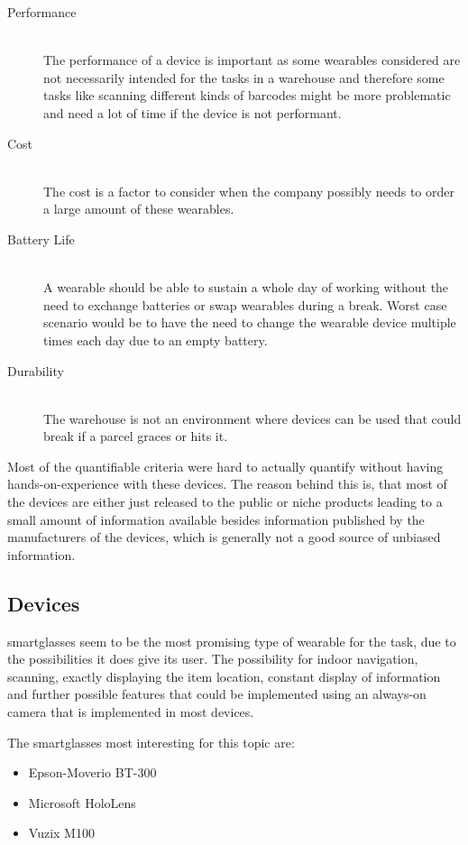 \begin{description}
	\item[Performance] \hfill \\
	The performance of a device is important as some wearables considered are not necessarily intended for the tasks in a warehouse and therefore some tasks like scanning different kinds of barcodes might be more problematic and need a lot of time if the device is not performant.
	\item[Cost] \hfill \\
	The cost is a factor to consider when the company possibly needs to order a large amount of these wearables.
	\item[Battery Life] \hfill \\
	A wearable should be able to sustain a whole day of working without the need to exchange batteries or swap wearables during a break. Worst case scenario would be to have the need to change the wearable device multiple times each day due to an empty battery.
	\item[Durability] \hfill \\
	The warehouse is not an environment where devices can be used that could break if a \gls{parcel} graces or hits it.
\end{description}
Most of the quantifiable criteria were hard to actually quantify without having hands-on-experience with these devices. The reason behind this is, that most of the devices are either just released to the public or niche products leading to a small amount of information available besides information published by the manufacturers of the devices, which is generally not a good source of unbiased information.

\subsection{Devices}

\Gls{smartglasses} seem to be the most promising type of wearable for the task, due to the possibilities it does give its user. The possibility for indoor navigation, scanning, exactly displaying the item location, constant display of information and further possible features that could be implemented using an always-on camera that is implemented in most devices. \citep{phdthesis:pickByVision}

The \gls{smartglasses} most interesting for this topic are:

\begin{itemize}
	\item Epson-Moverio BT-300
	\item Microsoft HoloLens
	\item Vuzix M100
\end{itemize}

